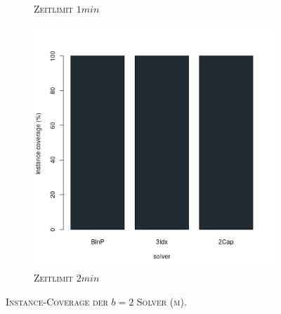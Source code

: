 \begin{figure}[H]
\begin{subfigure}[b]{0.3\textwidth}
\caption{\textsc{Zeitlimit} $1min$}
\label{fig:instance_cov_b=2_m_b}
\end{subfigure}
\hfill
\begin{subfigure}[b]{0.3\textwidth}
\centering
\includegraphics[width=1.1\textwidth]{img/solver_instance_coverage_b=2_m_120s.png}
\caption{\textsc{Zeitlimit} $2min$}
\label{fig:instance_cov_b=2_m_c}
\end{subfigure}
\caption{\textsc{Instance-Coverage der $b=2$ Solver (m)}.}
\label{fig:instance_cov_b=2}
\end{figure}

